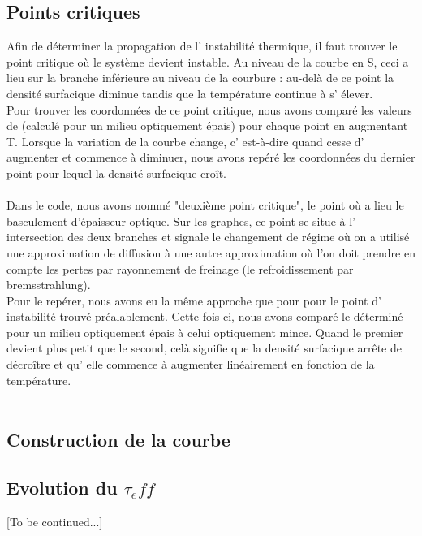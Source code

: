 \subsection{Points critiques}
Afin de déterminer la propagation de l' instabilité thermique, il faut trouver le point critique où le système devient instable. Au niveau de la courbe en S, ceci a lieu sur la branche inférieure au niveau de la courbure : au-delà de ce point la densité surfacique diminue tandis que la température continue à s' élever.
\\
Pour trouver les coordonnées de ce point critique, nous avons comparé les valeurs de \Sigma (calculé pour un milieu optiquement épais) pour chaque point en augmentant T. Lorsque la variation de la courbe change, c' est-à-dire quand \Sigma cesse d' augmenter et commence à diminuer, nous avons repéré les coordonnées du dernier point pour lequel la densité surfacique croît.
\\
[?discussion sur les autres manières envisagées ?]        
\\
Dans le code, nous avons nommé "deuxième point critique", le point où a lieu le basculement d'épaisseur optique. Sur les graphes, ce point se situe à l' intersection des deux branches et signale le changement de régime où on a utilisé une approximation de diffusion à une autre approximation où l'on doit prendre en compte les pertes par rayonnement de freinage (le refroidissement par bremsstrahlung).
\\
 Pour le repérer, nous avons eu la même approche que pour pour le point d' instabilité trouvé préalablement. Cette fois-ci, nous avons comparé le \Sigma déterminé pour un milieu optiquement épais à celui optiquement mince. Quand le premier devient plus petit que le second, celà signifie que la densité surfacique arrête de décroître et qu' elle commence à augmenter linéairement en fonction de la température. 
\\
[?si on mentionne la façon avec les dérivées : ce point là est un point anguleux!]
\\
[courbe en S avec les points légendés + ?evolution en fonction de r ?]

\subsection{Construction de la courbe}

\subsection{Evolution du $\tau_eff$}
[To be continued...]

\\
[DISCUSSION BLABLA]
